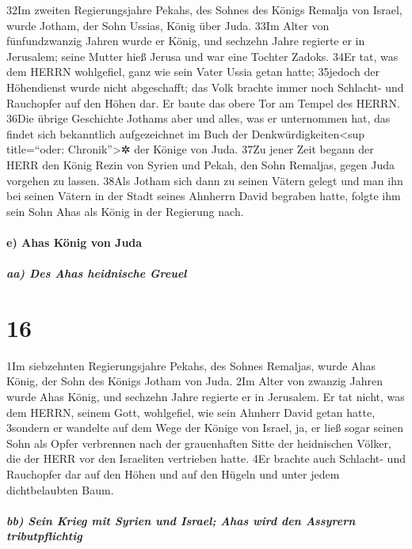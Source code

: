32Im zweiten Regierungsjahre Pekahs, des Sohnes des Königs Remalja von
Israel, wurde Jotham, der Sohn Ussias, König über Juda. 33Im Alter von
fünfundzwanzig Jahren wurde er König, und sechzehn Jahre regierte er in
Jerusalem; seine Mutter hieß Jerusa und war eine Tochter Zadoks. 34Er
tat, was dem HERRN wohlgefiel, ganz wie sein Vater Ussia getan hatte;
35jedoch der Höhendienst wurde nicht abgeschafft; das Volk brachte immer
noch Schlacht- und Rauchopfer auf den Höhen dar. Er baute das obere Tor
am Tempel des HERRN. 36Die übrige Geschichte Jothams aber und alles, was
er unternommen hat, das findet sich bekanntlich aufgezeichnet im Buch
der Denkwürdigkeiten\textless sup title=``oder: Chronik''\textgreater✲
der Könige von Juda. 37Zu jener Zeit begann der HERR den König Rezin von
Syrien und Pekah, den Sohn Remaljas, gegen Juda vorgehen zu lassen.
38Als Jotham sich dann zu seinen Vätern gelegt und man ihn bei seinen
Vätern in der Stadt seines Ahnherrn David begraben hatte, folgte ihm
sein Sohn Ahas als König in der Regierung nach.

\hypertarget{e-ahas-kuxf6nig-von-juda}{%
\paragraph{e) Ahas König von Juda}\label{e-ahas-kuxf6nig-von-juda}}

\hypertarget{aa-des-ahas-heidnische-greuel}{%
\subparagraph{aa) Des Ahas heidnische
Greuel}\label{aa-des-ahas-heidnische-greuel}}

\hypertarget{section-15}{%
\section{16}\label{section-15}}

1Im siebzehnten Regierungsjahre Pekahs, des Sohnes Remaljas, wurde Ahas
König, der Sohn des Königs Jotham von Juda. 2Im Alter von zwanzig Jahren
wurde Ahas König, und sechzehn Jahre regierte er in Jerusalem. Er tat
nicht, was dem HERRN, seinem Gott, wohlgefiel, wie sein Ahnherr David
getan hatte, 3sondern er wandelte auf dem Wege der Könige von Israel,
ja, er ließ sogar seinen Sohn als Opfer verbrennen nach der grauenhaften
Sitte der heidnischen Völker, die der HERR vor den Israeliten vertrieben
hatte. 4Er brachte auch Schlacht- und Rauchopfer dar auf den Höhen und
auf den Hügeln und unter jedem dichtbelaubten Baum.

\hypertarget{bb-sein-krieg-mit-syrien-und-israel-ahas-wird-den-assyrern-tributpflichtig}{%
\subparagraph{bb) Sein Krieg mit Syrien und Israel; Ahas wird den
Assyrern
tributpflichtig}\label{bb-sein-krieg-mit-syrien-und-israel-ahas-wird-den-assyrern-tributpflichtig}}

